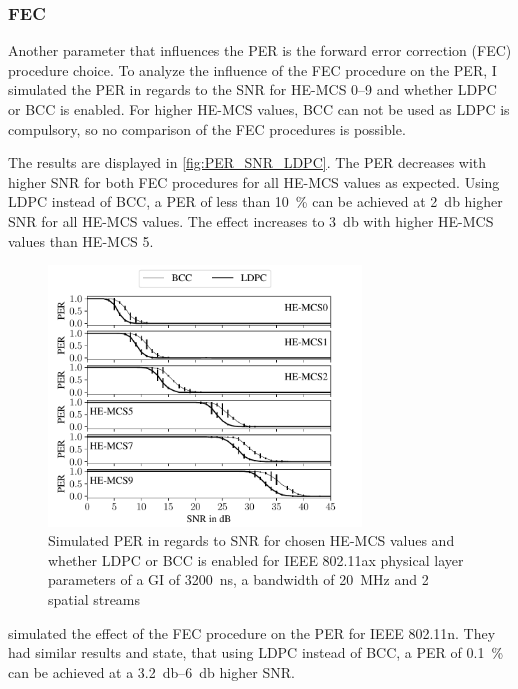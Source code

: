 \subsubsection*{\acf{FEC}}
Another parameter that influences the \ac{PER} is the forward error correction (FEC) procedure choice. To
analyze the influence of the FEC procedure on the \ac{PER}, I simulated the \ac{PER} in regards to the \ac{SNR} for HE-MCS
\numrange{0}{9} and whether \ac{LDPC} or \ac{BCC} is enabled. For higher HE-MCS values, \ac{BCC} can not be used as \ac{LDPC} is compulsory, so no comparison of the \ac{FEC} procedures is possible.

The results are displayed in \autoref{fig:PER_SNR_LDPC}. The \ac{PER} decreases with higher \ac{SNR} for both \ac{FEC} procedures for all HE-MCS values as
expected. Using \ac{LDPC} instead of \ac{BCC}, a \ac{PER} of less than \SI{10}{\percent} can be achieved at \SI{2}{\decibel} higher \ac{SNR}
for all HE-MCS values. The effect increases to \SI{3}{\decibel} with higher HE-MCS values than HE-MCS \num{5}.
\begin{figure}[H]%
   \centering
   \includegraphics[width=0.74\textwidth]{figures/LDPC_PER_to_SNR.pdf}
   \caption{Simulated \ac{PER} in regards to \ac{SNR} for chosen HE-\ac{MCS} values and whether \ac{LDPC} or \ac{BCC} is enabled for IEEE 802.11ax physical layer parameters of a \ac{GI} of \SI{3200}{\nano\second}, a bandwidth of \SI{20}{\mega\hertz} and 2 spatial streams}%
   \label{fig:PER_SNR_LDPC}%
\end{figure}

\textcite{syafei_performance_2009} simulated the effect of the \ac{FEC} procedure on the \ac{PER} for IEEE 802.11n. They
had similar results and state, that using \ac{LDPC} instead of \ac{BCC}, a \ac{PER} of \SI{0.1}{\percent}  can be achieved at a
\SIrange{3.2}{6}{\decibel} higher \ac{SNR}.

